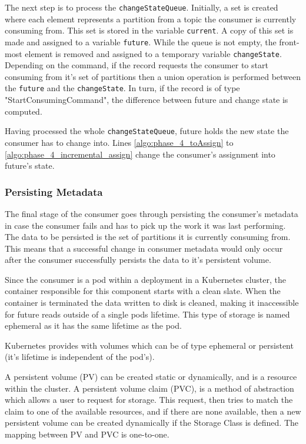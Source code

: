 The next step is to process the \lstinline[language=Python]{changeStateQueue}. Initially, a set is created where each element represents a partition from a topic the consumer is currently consuming from. This set is stored in the variable \lstinline[language=Python]{current}. A copy of this set is made and assigned to a variable \lstinline[language=Python]{future}. While the queue is not empty, the front-most element is removed and assigned to a temporary variable \lstinline[language=Python]{changeState}. Depending on the command, if the record requests the consumer to start consuming from it's set of partitions then a union operation is performed between the \lstinline[language=Python]{future} and the \lstinline[language=Python]{changeState}. In turn, if the record is of type "StartConsumingCommand", the difference between future and change state is computed.

Having processed the whole \lstinline[language=Python]{changeStateQueue}, future holds the new state the consumer has to change into. Lines \ref{algo:phase_4_toAssign} to \ref{algo:phase_4_incremental_assign} change the consumer's assignment into future's state.

\subsubsection{Persisting Metadata}

The final stage of the consumer goes through persisting the consumer's metadata in case the consumer fails and has to pick up the work it was last performing. The data to be persisted is the set of partitions it is currently consuming from. This means that a successful change in consumer metadata would only occur after the consumer successfully persists the data to it's persistent volume.

Since the consumer is a pod within a deployment in a Kubernetes cluster, the container responsible for this component starts with a clean slate. When the container is terminated the data written to disk is cleaned,  making it inaccessible for future reads outside of a single pods lifetime. This type of storage is named ephemeral as it has the same lifetime as the pod.

Kubernetes provides with volumes which can be of type ephemeral or persistent (it's lifetime is independent of the pod's). 

A persistent volume (PV) can be created static or dynamically, and is a resource within the cluster. A persistent volume claim (PVC), is a method of abstraction which allows a user to request for storage. This request, then tries to match the claim to one of the available resources, and if there are none available, then a new persistent volume can be created dynamically if the Storage Class is defined. The mapping between PV and PVC is one-to-one.

